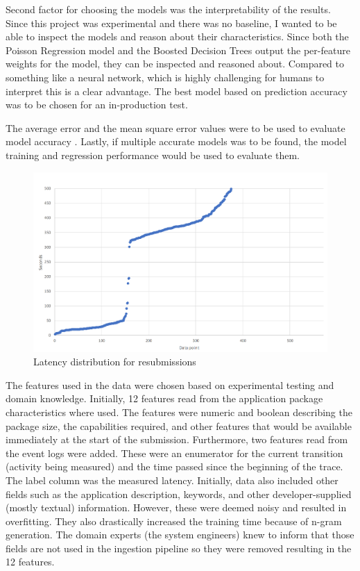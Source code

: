 Second factor for choosing the models was the interpretability of the results.
Since this project was experimental and there was no baseline, I wanted to be able to inspect the models and reason about their characteristics.
Since both the Poisson Regression model and the Boosted Decision Trees output the per-feature weights for the model, they can be inspected and reasoned about.
Compared to something like a neural network, which is highly challenging for humans to interpret  this is a clear advantage.
The best model based on prediction accuracy was to be chosen for an in-production test.

The average error and the mean square error values were to be used to evaluate model accuracy .
Lastly, if multiple accurate models was to be found, the model training and regression performance would be used to evaluate them.

\begin{figure}[htb]
    \centering \includegraphics[width=0.6\linewidth]{gfx/resubmissions.png}
    \caption{Latency distribution for resubmissions }
    \label{fig:resubmissions}
\end{figure}

The features used in the data were chosen based on experimental testing and domain knowledge.
Initially, 12 features read from the application package characteristics where used. The features were numeric and boolean describing the package size, the capabilities required, and other features that would be available immediately at the start of the submission.
Furthermore, two features read from the event logs were added.
These were an enumerator for the current transition (activity being measured) and the time passed since the beginning of the trace.
The label column was the measured latency.
Initially, data also included other fields such as the application description, keywords, and other developer-supplied (mostly textual) information. 
However, these were deemed noisy and resulted in overfitting.
They also drastically increased the training time because of n-gram generation.
The domain experts (the system engineers) knew to inform that those fields are not used in the ingestion pipeline so they were removed resulting in the 12 features.

